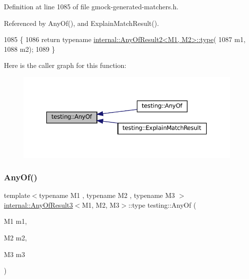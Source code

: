 Definition at line 1085 of file gmock-\/generated-\/matchers.\+h.



Referenced by Any\+Of(), and Explain\+Match\+Result().


\begin{DoxyCode}
1085                     \{
1086   \textcolor{keywordflow}{return} \textcolor{keyword}{typename} \hyperlink{namespacegenerate__debs_a50bc9a7ecac9584553e089a448bcde58}{internal::AnyOfResult2<M1, M2>::type}(
1087       m1,
1088       m2);
1089 \}
\end{DoxyCode}
Here is the caller graph for this function\+:
\nopagebreak
\begin{figure}[H]
\begin{center}
\leavevmode
\includegraphics[width=350pt]{namespacetesting_a81cfefd9f75cdce827d5bc873cf73aac_icgraph}
\end{center}
\end{figure}
\mbox{\label{namespacetesting_a3ccbde3ba01189587676d44a4333c0a5}} 
\subsubsection{\texorpdfstring{Any\+Of()}{AnyOf()}\hspace{0.1cm}{\footnotesize\ttfamily [2/9]}}
{\footnotesize\ttfamily template$<$typename M1 , typename M2 , typename M3 $>$ \\
\hyperlink{structtesting_1_1internal_1_1AnyOfResult3}{internal\+::\+Any\+Of\+Result3}$<$M1, M2, M3$>$\+::type testing\+::\+Any\+Of (\begin{DoxyParamCaption}\item[{M1}]{m1,  }\item[{M2}]{m2,  }\item[{M3}]{m3 }\end{DoxyParamCaption})\hspace{0.3cm}{\ttfamily [inline]}}



